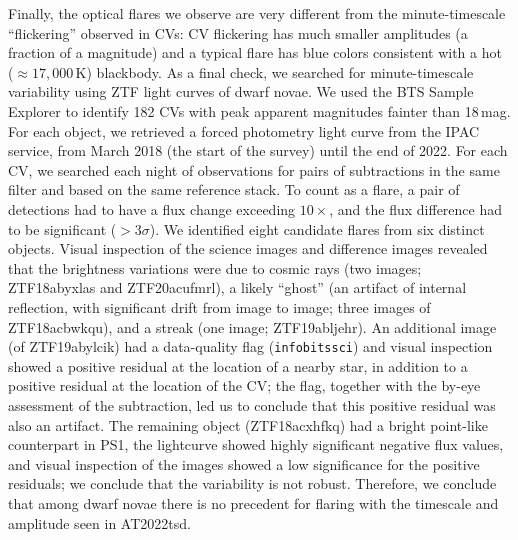 \documentclass{nature_plusfigure}
\newcommand{\at}{AT2022tsd}
\begin{document}
\begin{methods}
Finally, the optical flares we observe are very different from the minute-timescale ``flickering'' observed in CVs: CV flickering has much smaller amplitudes (a fraction of a magnitude\cite{Bruch2021}) and a typical flare has blue colors consistent with a hot ($\approx17,000\,$K) blackbody\cite{Bruch2021}.
As a final check, we searched for minute-timescale variability using ZTF light curves of dwarf novae. 
We used the BTS Sample Explorer to identify 182 CVs with peak apparent magnitudes fainter than 18\,mag.
For each object, we retrieved a forced photometry light curve from the IPAC service, from March 2018 (the start of the survey) until the end of 2022. For each CV, we searched each night of observations for pairs of subtractions in the same filter and based on the same reference stack.
To count as a flare, a pair of detections had to have a flux change exceeding $10\times$, and the flux difference had to be significant ($>3\sigma$).
We identified eight candidate flares from six distinct objects. Visual inspection of the science images and difference images revealed that the brightness variations were due to cosmic rays (two images; ZTF18abyxlas and ZTF20acufmrl), a likely ``ghost'' (an artifact of internal reflection, with significant drift from image to image; three images of ZTF18acbwkqu), and a streak (one image; ZTF19abljehr). An additional image (of ZTF19abylcik) had a data-quality flag (\texttt{infobitssci}) and visual inspection showed a positive residual at the location of a nearby star, in addition to a positive residual at the location of the CV; the flag, together with the by-eye assessment of the subtraction, led us to conclude that this positive residual was also an artifact. The remaining object (ZTF18acxhfkq) had a bright point-like counterpart in PS1, the lightcurve showed highly significant negative flux values, and visual inspection of the images showed a low significance for the positive residuals; we conclude that the variability is not robust.  
Therefore, we conclude that among dwarf novae there is no precedent for flaring with the timescale and amplitude seen in \at.


\end{methods}
\end{document}
